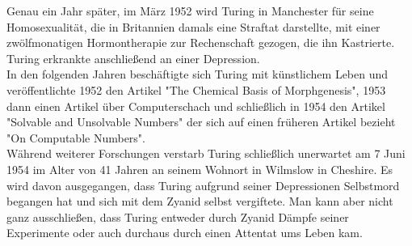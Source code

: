 Genau ein Jahr später, im März 1952 wird Turing in Manchester für seine Homosexualität, die in Britannien damals eine Straftat darstellte, mit einer zwölfmonatigen Hormontherapie zur Rechenschaft gezogen, die ihn Kastrierte. Turing erkrankte anschließend an einer Depression.\\
In den folgenden Jahren beschäftigte sich Turing mit künstlichem Leben und veröffentlichte 1952 den Artikel "The Chemical Basis of Morphgenesis", 1953 dann einen Artikel über Computerschach und schließlich in 1954 den Artikel "Solvable and Unsolvable Numbers" der sich auf einen früheren Artikel bezieht "On Computable Numbers".\\
Während weiterer Forschungen verstarb Turing schließlich unerwartet am 7 Juni 1954 im Alter von 41 Jahren an seinem Wohnort in Wilmslow in Cheshire. Es wird davon ausgegangen, dass Turing aufgrund seiner Depressionen Selbstmord begangen hat und sich mit dem Zyanid selbst vergiftete. Man kann aber nicht ganz ausschließen, dass Turing entweder durch Zyanid Dämpfe seiner Experimente oder auch durchaus durch einen Attentat ums Leben kam. 

